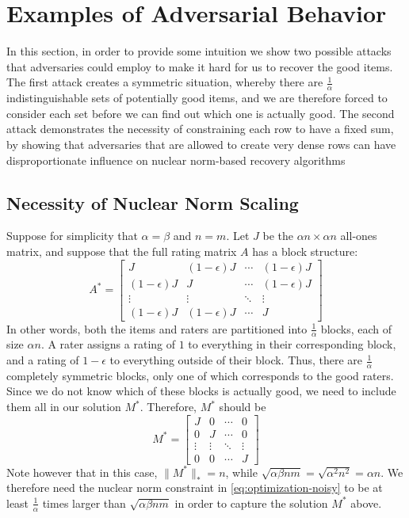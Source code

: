 \section{Examples of Adversarial Behavior}

In this section, in order to provide some intuition we show 
two possible attacks that adversaries could employ to make it 
hard for us to recover the good items. The first attack creates a 
symmetric situation, whereby there are $\frac{1}{\alpha}$ indistinguishable 
sets of potentially good items, and we are therefore forced to consider 
each set before we can find out which one is actually good. The 
second attack demonstrates the necessity of constraining each row 
to have a fixed sum, by showing that adversaries that are allowed to 
create very dense rows can have disproportionate influence on nuclear norm-based 
recovery algorithms

\subsection{Necessity of Nuclear Norm Scaling}

Suppose for simplicity that $\alpha = \beta$ and $n = m$. Let $J$ be the 
$\alpha n \times \alpha n$ all-ones matrix, and suppose that the full 
rating matrix $A$ has a block structure:
\begin{equation}
A^* = \left[ \begin{array}{cccc} J & (1-\epsilon)J & \cdots & (1-\epsilon)J \\ (1-\epsilon)J & J & \cdots & (1-\epsilon)J \\ \vdots & \vdots & \ddots & \vdots \\ (1-\epsilon)J & (1-\epsilon)J & \cdots & J \end{array} \right]
\end{equation}
In other words, both the items and raters are partitioned into $\frac{1}{\alpha}$ 
blocks, each of size $\alpha n$. A rater assigns a rating of $1$ to 
everything in their corresponding block, and a rating of $1-\epsilon$ to 
everything outside of their block. Thus, there are $\frac{1}{\alpha}$ completely 
symmetric blocks, only one of which corresponds to the good raters. Since we do 
not know which of these blocks is actually good, we need to include them all 
in our solution $M^*$. Therefore, $M^*$ should be
\begin{equation}
M^* = \left[ \begin{array}{cccc} J & 0 & \cdots & 0 \\ 0 & J & \cdots & 0 \\ \vdots & \vdots & \ddots & \vdots \\ 0 & 0 & \cdots & J \end{array} \right]
\end{equation}
Note however that in this case, $\|M^*\|_* = n$, while 
$\sqrt{\alpha\beta nm} = \sqrt{\alpha^2n^2} = \alpha n$. We therefore need the 
nuclear norm constraint in \eqref{eq:optimization-noisy} to be at least 
$\frac{1}{\alpha}$ times larger than $\sqrt{\alpha\beta nm}$ in order to capture 
the solution $M^*$ above.

